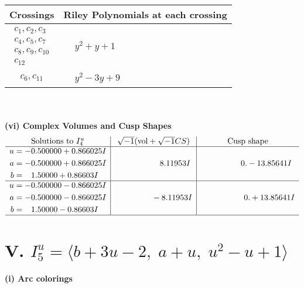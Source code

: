 \documentclass[1p]{elsarticle_modified}
\theoremstyle{definition}
\newcommand{\I}{\sqrt{-1}}
\begin{document}
\begin{tabular}{m{50pt}|m{274pt}}
Crossings & \hspace{64pt}Riley Polynomials at each crossing \\
\hline $$\begin{aligned}c_{1},c_{2},c_{3}\\c_{4},c_{5},c_{7}\\c_{8},c_{9},c_{10}\\c_{12}\end{aligned}$$&$\begin{aligned}
&y^2+y+1
\end{aligned}$\\
\hline $$\begin{aligned}c_{6},c_{11}\end{aligned}$$&$\begin{aligned}
&y^2-3 y+9
\end{aligned}$\\
\hline
\end{tabular}\\~\\
\newpage\flushleft \textbf{(vi) Complex Volumes and Cusp Shapes}
$$\begin{array}{c|c|c}  
\text{Solutions to }I^u_{4}& \I (\text{vol} + \sqrt{-1}CS) & \text{Cusp shape}\\
 \hline 
\begin{aligned}
u &= -0.500000 + 0.866025 I \\
a &= -0.500000 + 0.866025 I \\
b &= \phantom{-}1.50000 + 0.86603 I\end{aligned}
 & \phantom{-0.000000 -}8.11953 I & \phantom{-0.000000 } 0. - 13.85641 I \\ \hline\begin{aligned}
u &= -0.500000 - 0.866025 I \\
a &= -0.500000 - 0.866025 I \\
b &= \phantom{-}1.50000 - 0.86603 I\end{aligned}
 & \phantom{-0.000000 } -8.11953 I & \phantom{-0.000000 -}0. + 13.85641 I\\
 \hline 
 \end{array}$$\newpage\newpage\renewcommand{\arraystretch}{1}
\centering \section*{V. $I^u_{5}= \langle b+3 u-2,\;a+u,\;u^2- u+1 \rangle$}
\flushleft \textbf{(i) Arc colorings}\\
\end{document}
